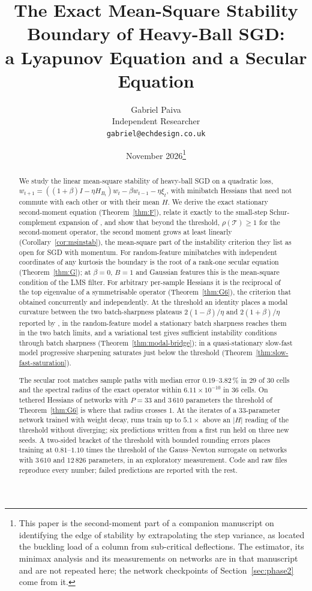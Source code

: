 \documentclass[11pt]{article}
\title{The Exact Mean-Square Stability Boundary of Heavy-Ball SGD:\\a Lyapunov Equation and a Secular Equation}
\author{Gabriel Paiva\\ Independent Researcher\\ \texttt{gabriel@echdesign.co.uk}}
\date{November 2026\thanks{This paper is the second-moment part of a companion manuscript on identifying the edge of stability by extrapolating the step variance, as \citet{southwell1932} located the buckling load of a column from sub-critical deflections. The estimator, its minimax analysis and its measurements on networks are in that manuscript and are not repeated here; the network checkpoints of Section~\ref{sec:phase2} come from it.}}
\theoremstyle{remark}
\begin{document}
\maketitle

\begin{abstract}
We study the linear mean-square stability of heavy-ball SGD on a quadratic loss, $w_{t+1}=((1+\beta)I-\eta H_{B_t})w_t-\beta w_{t-1}-\eta\xi_t$, with minibatch Hessians that need not commute with each other or with their mean $H$. We derive the exact stationary second-moment equation (Theorem~\ref{thm:F}), relate it exactly to the small-step Schur-complement expansion of \citet{andreyev2026momentum}, and show that beyond the threshold, $\rho(\mathcal T)\ge1$ for the second-moment operator, the second moment grows at least linearly (Corollary~\ref{cor:msinstab}), the mean-square part of the instability criterion they list as open for SGD with momentum. For random-feature minibatches with independent coordinates of any kurtosis the boundary is the root of a rank-one secular equation (Theorem~\ref{thm:G}); at $\beta=0$, $B=1$ and Gaussian features this is the mean-square condition of the LMS filter. For arbitrary per-sample Hessians it is the reciprocal of the top eigenvalue of a symmetrisable operator (Theorem~\ref{thm:G6}), the criterion that \citet[Theorem~F.1]{cai2026llm} obtained concurrently and independently. At the threshold an identity places a modal curvature between the two batch-sharpness plateaus $2(1-\beta)/\eta$ and $2(1+\beta)/\eta$ reported by \citet{andreyev2026momentum}, in the random-feature model a stationary batch sharpness reaches them in the two batch limits, and a variational test gives sufficient instability conditions through batch sharpness (Theorem~\ref{thm:modal-bridge}); in a quasi-stationary slow-fast model progressive sharpening saturates just below the threshold (Theorem~\ref{thm:slow-fast-saturation}).

The secular root matches sample paths with median error $0.19$--$3.82\,\%$ in 29 of 30 cells and the spectral radius of the exact operator within $6.11\times10^{-10}$ in 36 cells. On tethered Hessians of networks with $P=33$ and $3\,610$ parameters the threshold of Theorem~\ref{thm:G6} is where that radius crosses $1$. At the iterates of a $33$-parameter network trained with weight decay, runs train up to $5.1\times$ above an $|H|$ reading of the threshold without diverging; six predictions written from a first run held on three new seeds. A two-sided bracket of the threshold with bounded rounding errors places training at $0.81$--$1.10$ times the threshold of the Gauss--Newton surrogate on networks with $3\,610$ and $12\,826$ parameters, in an exploratory measurement. Code and raw files reproduce every number; failed predictions are reported with the rest.
\end{abstract}
\end{document}
